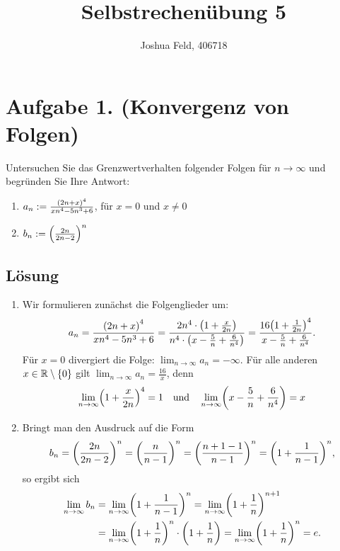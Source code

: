 \documentclass[german,12pt]{homework}
\title{Selbstrechenübung 5}
\author{Joshua Feld, 406718}
\institute{RWTH Aachen University\\Center for Computational Engineering Science}
\newcommand{\RR}{\mathbb{R}}
\DeclarePairedDelimiter{\enbrace}{(}{)}
\DeclarePairedDelimiter{\penbrace}{\{}{\}}
\begin{document}
    \maketitle

    \section*{Aufgabe 1. (Konvergenz von Folgen)}

    \begin{problem}
        Untersuchen Sie das Grenzwertverhalten folgender Folgen für \(n \to
        \infty\) und begründen Sie Ihre Antwort:
        \begin{enumerate}
            \item \(a_n := \frac{\enbrace*{2n + x}^4}{xn^4 - 5n^3 + 6}\), für
            \(x = 0\) und \(x \ne 0\)
            \item \(b_n := \enbrace*{\frac{2n}{2n - 2}}^n\)
        \end{enumerate}
    \end{problem}

    \subsection*{Lösung}
    \begin{enumerate}
        \item Wir formulieren zunächst die Folgenglieder um:
        \[a_n = \frac{\enbrace*{2n + x}^4}{xn^4 - 5n^3 + 6} = \frac{2n^4 \cdot
        \enbrace*{1 + \frac{x}{2n}}}{n^4 \cdot \enbrace*{x - \frac{5}{n} +
        \frac{6}{n^4}}} = \frac{16\enbrace*{1 + \frac{1}{2n}}^4}{x -
        \frac{5}{n} + \frac{6}{n^4}}.\]
        Für \(x = 0\) divergiert die Folge:
        \(\lim_{n \to \infty}a_n = -\infty.\)
        Für alle anderen \(x \in \RR \setminus \penbrace*{0}\) gilt \(\lim_{n
        \to \infty}a_n = \frac{16}{x}\), denn
        \[\lim_{n \to \infty}\enbrace*{1 + \frac{x}{2n}}^4 = 1 \quad \text{und}
        \quad \lim_{n \to \infty}\enbrace*{x - \frac{5}{n} + \frac{6}{n^4}} =
        x\]
        \item Bringt man den Ausdruck auf die Form
        \[b_n = \enbrace*{\frac{2n}{2n - 2}}^n = \enbrace*{\frac{n}{n - 1}}^n =
        \enbrace*{\frac{n + 1 - 1}{n - 1}}^n = \enbrace*{1 + \frac{1}{n -
        1}}^n,\]
        so ergibt sich
        \begin{align*}
            \lim_{n \to \infty}b_n &= \lim_{n \to \infty}\enbrace*{1 +
            \frac{1}{n - 1}}^n = \lim_{n \to \infty}\enbrace*{1 +
            \frac{1}{n}}^{n + 1}\\
            &= \lim_{n \to \infty}\enbrace*{1 + \frac{1}{n}}^n \cdot
            \enbrace*{1 + \frac{1}{n}} = \lim_{n \to \infty}\enbrace*{1 +
            \frac{1}{n}}^n = e.
        \end{align*}
    \end{enumerate}
\end{document}
